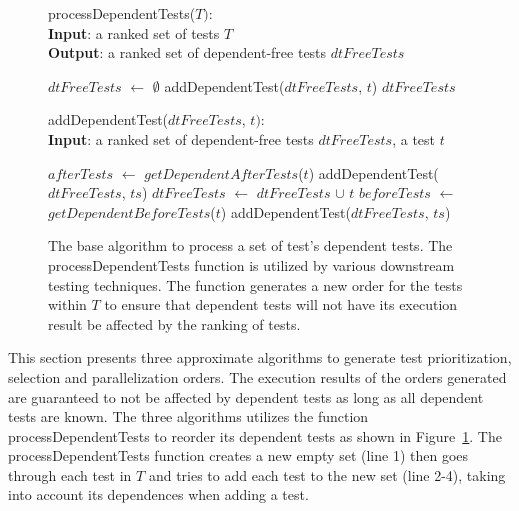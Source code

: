 \begin{figure}[t]
	processDependentTests($\mathit{T}):$\\
	\textbf{Input}: a ranked set of tests $\mathit{T}$\\
	\textbf{Output}: a ranked set of dependent-free tests $\mathit{dtFreeTests}$\\
	\vspace{-5mm}
	\begin{algorithmic}[1]
		\STATE $\mathit{dtFreeTests}$ $\leftarrow$ $\emptyset$
			\STATE addDependentTest($\mathit{dtFreeTests}$, $\mathit{t}$)	
		\ENDFOR
		\RETURN $\mathit{dtFreeTests}$
	\end{algorithmic}

	addDependentTest($\mathit{dtFreeTests}$, $\mathit{t}):$\\
	\textbf{Input}: a ranked set of dependent-free tests $\mathit{dtFreeTests}$, a test $\mathit{t}$\\
	\vspace{-5mm}
	\begin{algorithmic}[1]
			\STATE $\mathit{afterTests}$ $\leftarrow$ $\mathit{getDependentAfterTests}$($\mathit{t}$)
				\STATE addDependentTest($\mathit{dtFreeTests}$, $\mathit{ts}$)
			\ENDFOR
			\STATE $\mathit{dtFreeTests}$ $\leftarrow$ $\mathit{dtFreeTests}$ $\cup$ $\mathit{t}$
			\STATE $\mathit{beforeTests}$ $\leftarrow$ $\mathit{getDependentBeforeTests}$($\mathit{t}$)
				\STATE addDependentTest($\mathit{dtFreeTests}$, $\mathit{ts}$)
			\ENDFOR
		\ENDIF
	\end{algorithmic}
	\vspace{-3mm}
	\caption {
		The base algorithm to process a set of test's dependent tests. The processDependentTests function is utilized by various downstream testing techniques. The function generates a new order for the tests within $\mathit{T}$ to ensure that dependent tests will not have its execution result be affected by the ranking of tests. 
	}
	\label{fig:detectingDT}
\end{figure}
This section presents three approximate algorithms to generate test prioritization, selection and parallelization orders. The execution results of the orders generated are guaranteed to not be affected by dependent tests as long as all dependent tests are known. The three algorithms utilizes the function processDependentTests to reorder its dependent tests as shown in Figure~\ref{fig:detectingDT}. The processDependentTests function creates a new empty set (line 1) then goes through each test in $\mathit{T}$ and tries to add each test to the new set (line 2-4), taking into account its dependences when adding a test. 


